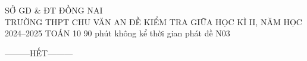 \ExamMode
\ExamInfo
    {SỞ GD \& ĐT ĐỒNG NAI\\TRƯỜNG THPT CHU VĂN AN}
    {ĐỀ KIỂM TRA GIỮA HỌC KÌ II, NĂM HỌC 2024--2025}
    {TOÁN 10}
    {90 phút}
    {không kể thời gian phát đề}
    {N03}
\ShowHeaderQR

\MakeExamHeader





\begin{center}
---------HẾT---------
\end{center}
